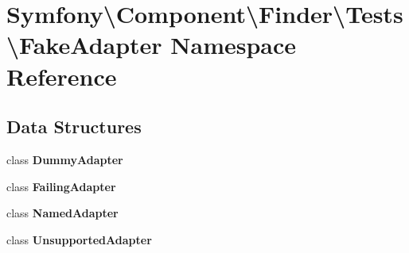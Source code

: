 \section{Symfony\textbackslash{}Component\textbackslash{}Finder\textbackslash{}Tests\textbackslash{}Fake\+Adapter Namespace Reference}
\label{namespace_symfony_1_1_component_1_1_finder_1_1_tests_1_1_fake_adapter}
\subsection*{Data Structures}
\begin{DoxyCompactItemize}
\item 
class {\bf Dummy\+Adapter}
\item 
class {\bf Failing\+Adapter}
\item 
class {\bf Named\+Adapter}
\item 
class {\bf Unsupported\+Adapter}
\end{DoxyCompactItemize}
